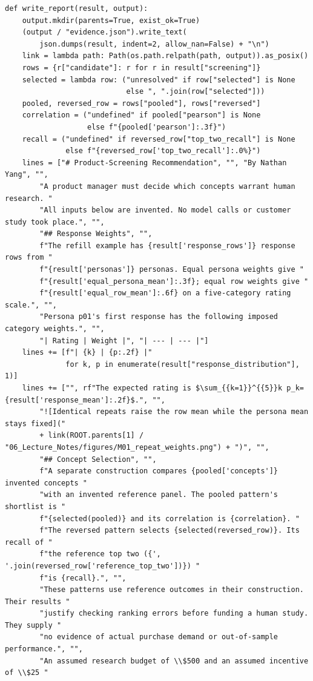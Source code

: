 \begin{Verbatim}[breaklines,breakanywhere,fontsize=\small]
def write_report(result, output):
    output.mkdir(parents=True, exist_ok=True)
    (output / "evidence.json").write_text(
        json.dumps(result, indent=2, allow_nan=False) + "\n")
    link = lambda path: Path(os.path.relpath(path, output)).as_posix()
    rows = {r["candidate"]: r for r in result["screening"]}
    selected = lambda row: ("unresolved" if row["selected"] is None
                            else ", ".join(row["selected"]))
    pooled, reversed_row = rows["pooled"], rows["reversed"]
    correlation = ("undefined" if pooled["pearson"] is None
                   else f"{pooled['pearson']:.3f}")
    recall = ("undefined" if reversed_row["top_two_recall"] is None
              else f"{reversed_row['top_two_recall']:.0%}")
    lines = ["# Product-Screening Recommendation", "", "By Nathan Yang", "",
        "A product manager must decide which concepts warrant human research. "
        "All inputs below are invented. No model calls or customer study took place.", "",
        "## Response Weights", "",
        f"The refill example has {result['response_rows']} response rows from "
        f"{result['personas']} personas. Equal persona weights give "
        f"{result['equal_persona_mean']:.3f}; equal row weights give "
        f"{result['equal_row_mean']:.6f} on a five-category rating scale.", "",
        "Persona p01's first response has the following imposed category weights.", "",
        "| Rating | Weight |", "| --- | --- |"]
    lines += [f"| {k} | {p:.2f} |"
              for k, p in enumerate(result["response_distribution"], 1)]
    lines += ["", rf"The expected rating is $\sum_{{k=1}}^{{5}}k p_k={result['response_mean']:.2f}$.", "",
        "![Identical repeats raise the row mean while the persona mean stays fixed]("
        + link(ROOT.parents[1] / "06_Lecture_Notes/figures/M01_repeat_weights.png") + ")", "",
        "## Concept Selection", "",
        f"A separate construction compares {pooled['concepts']} invented concepts "
        "with an invented reference panel. The pooled pattern's shortlist is "
        f"{selected(pooled)} and its correlation is {correlation}. "
        f"The reversed pattern selects {selected(reversed_row)}. Its recall of "
        f"the reference top two ({', '.join(reversed_row['reference_top_two'])}) "
        f"is {recall}.", "",
        "These patterns use reference outcomes in their construction. Their results "
        "justify checking ranking errors before funding a human study. They supply "
        "no evidence of actual purchase demand or out-of-sample performance.", "",
        "An assumed research budget of \\$500 and an assumed incentive of \\$25 "

\end{Verbatim}
